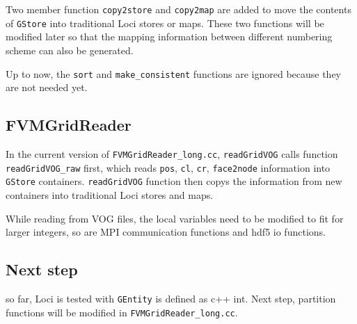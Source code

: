 \documentclass{article}
\begin{document}
Two member function \texttt{copy2store} and \texttt{copy2map} are added to move the
contents of \texttt{GStore} into traditional Loci stores or maps. These two
functions will be modified later so that the mapping information
between different numbering scheme can also be generated. 

Up to now, the \texttt{sort} and \texttt{make\_consistent} functions are ignored because
they are not needed yet.  

 
\subsection{FVMGridReader}  
  In the current version of \texttt{FVMGridReader\_long.cc}, \texttt{readGridVOG} calls function \texttt{readGridVOG\_raw}
  first,  which reads \texttt{pos}, \texttt{cl}, \texttt{cr}, \texttt{face2node} information into \texttt{GStore}
  containers. \texttt{readGridVOG} function then  copys the information from new
  containers into traditional Loci stores and maps.

  While reading from VOG files, the local variables need to be modified
  to fit for larger integers, so are MPI communication functions and hdf5 io
  functions. 
   
\subsection{Next step}        
 so far, Loci is tested with \texttt{GEntity} is defined as c++ int. Next step,
 partition functions will be modified in \texttt{FVMGridReader\_long.cc}.
\end{document}
